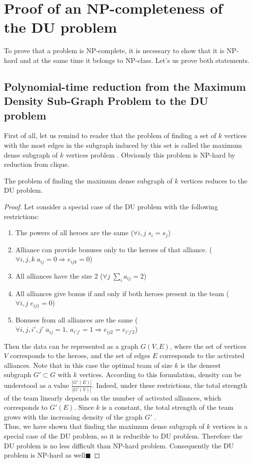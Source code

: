 \documentclass[smallextended]{svjour3}       %
\begin{document}
\section{Proof of an NP-completeness of the DU problem}
\label{SectionNPCompleteProof}
To prove that a problem is NP-complete, it is necessary to show that it is NP-hard and at the same time it belongs to NP-class.
Let's us prove both statements.
\subsection{Polynomial-time reduction from the Maximum Density Sub-Graph Problem to the DU problem}
First of all, let us remind to reader that the problem of finding a set of $k$ vertices with the most edges in the subgraph induced by this set is called the maximum dense subgraph of $k$ vertices problem \cite{kortsarz1993choosing}.
Obviously this problem is NP-hard by reduction from clique.
\begin{theorem}
\label{MEWC_DU}
The problem of finding the maximum dense subgraph of $k$ vertices reduces to the DU problem.
\end{theorem}
\begin{proof}
Let consider a special case of the DU problem with the following restrictions:
\begin{enumerate}
    \item The powers of all heroes are the same ($\forall i, j \; s_i=s_j$)
    \item Alliance can provide bonuses only to the heroes of that alliance. ($\forall i, j, k \; a_{ij}=0 \Longrightarrow e_{ijk} = 0$)
    \item All alliances have the size 2 ($\forall j \; \sum_i a_{ij}=2 $)
    \item All alliances give bonus if and only if both heroes present in the team ($\forall i, j \; e_{ij1}=0$)
    \item Bonuses from all alliances are the same ($\forall i, j, i', j' \; a_{ij}=1,\, a_{i' j'}=1 \Longrightarrow e_{ij2}=e_{i' j' 2}$)
\end{enumerate}
Then the data can be represented as a graph $ G(V, E) $, where the set of vertices $ V $ corresponds to the heroes, and the set of edges $E$ corresponds to the activated alliances. Note that in this case the optimal team of size $ k $ is the densest subgraph $ G' \subset G $ with $ k $ vertices.
According to this formulation, density can be understood as a value $ \frac{|G'(E)|}{|G'(V)|} $.
Indeed, under these restrictions, the total strength of the team linearly depends on the number of activated alliances, which corresponds to $ G'(E)$.
Since $ k $ is a constant, the total strength of the team grows with the increasing density of the graph $ G '$ .\\
Thus, we have shown that finding the maximum dense subgraph of $k$ vertices is a special case of the DU problem, so it is reducible to DU problem.
Therefore the DU problem is no less difficult than NP-hard  problem. Consequently the DU problem is NP-hard as well$\blacksquare$
\end{proof}
\end{document}
